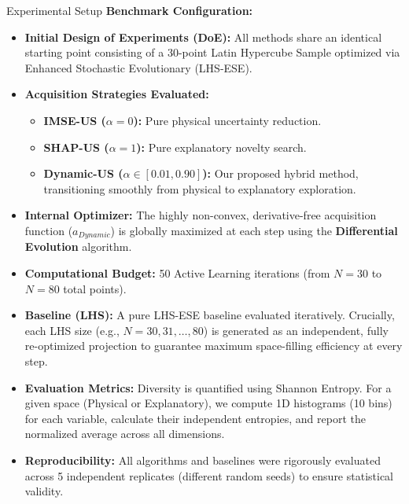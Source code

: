 \documentclass[10pt, aspectratio=169]{beamer}
\begin{document}
\begin{frame}[fragile]{Experimental Setup}
  \textbf{Benchmark Configuration:}
  \begin{itemize}
      \item \textbf{Initial Design of Experiments (DoE):} All methods share an identical starting point consisting of a 30-point Latin Hypercube Sample optimized via Enhanced Stochastic Evolutionary (LHS-ESE).
      \item \textbf{Acquisition Strategies Evaluated:}
      \begin{itemize}
          \item \textbf{IMSE-US ($\alpha = 0$):} Pure physical uncertainty reduction.
          \item \textbf{SHAP-US ($\alpha = 1$):} Pure explanatory novelty search.
          \item \textbf{Dynamic-US ($\alpha \in [0.01, 0.90]$):} Our proposed hybrid method, transitioning smoothly from physical to explanatory exploration.
      \end{itemize}
      \item \textbf{Internal Optimizer:} The highly non-convex, derivative-free acquisition function ($a_{Dynamic}$) is globally maximized at each step using the \textbf{Differential Evolution} algorithm.
      \item \textbf{Computational Budget:} 50 Active Learning iterations (from $N=30$ to $N=80$ total points).
      \item \textbf{Baseline (LHS):} A pure LHS-ESE baseline evaluated iteratively. Crucially, each LHS size (e.g., $N=30, 31, \dots, 80$) is generated as an independent, fully re-optimized projection to guarantee maximum space-filling efficiency at every step.
      \item \textbf{Evaluation Metrics:} Diversity is quantified using Shannon Entropy. For a given space (Physical or Explanatory), we compute 1D histograms (10 bins) for each variable, calculate their independent entropies, and report the normalized average across all dimensions.
      \item \textbf{Reproducibility:} All algorithms and baselines were rigorously evaluated across 5 independent replicates (different random seeds) to ensure statistical validity.
  \end{itemize}
\end{frame}
\end{document}
